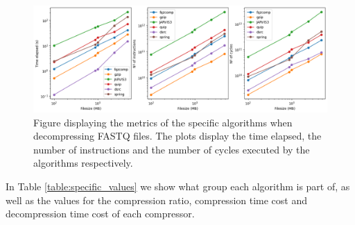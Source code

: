     \begin{figure}[h]
        \centering
        \includegraphics[width=1\textwidth]{figs/fastq_dstats.png}
        \caption[Figure displaying the metrics of the specific algorithms when decompressing FASTQ files.] {Figure displaying the metrics of the specific algorithms when decompressing FASTQ files. The plots display the time elapsed, the number of instructions and the number of cycles executed by the algorithms respectively.}
        \label{fig:fastq_dstats}
    \end{figure}


    In Table \ref{table:specific_values} we show what group each algorithm is part of, as well as the values for the compression ratio, compression time cost and decompression time cost of each compressor.


